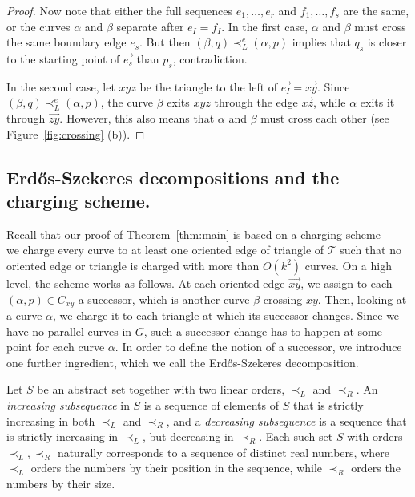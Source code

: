 \documentclass[11pt]{amsart}
\theoremstyle{definition}
\newcommand{\cT}{\mathcal{T}}
\begin{document}
\begin{proof}
\begin{minipage}[t]{0.65\textwidth}
Now note that either the full sequences $e_1, \dots, e_r$ and $f_1, \dots, f_s$ are the same, or the curves $\alpha$ and $\beta$ separate after $e_I=f_I$. 
In the first case, $\alpha$ and $\beta$ must cross the same boundary edge $e_s$. But then $(\beta, q)\prec_L^{e} (\alpha, p)$ implies that $q_s$ is closer to the starting point of $\vec{e_s}$ than $p_s$, contradiction.

In the second case, let $xyz$ be the triangle to the left of $\vec{e_I}=\vec{xy}$.
Since $(\beta, q)\prec_L^{e}(\alpha, p)$, the curve $\beta$ exits $xyz$ through the edge $\vec{xz}$, while $\alpha$ exits it through $\vec{zy}$. However, this also means that $\alpha$ and $\beta$ must cross each other (see Figure~\ref{fig:crossing} (b)).\qedhere

\end{minipage}\par
\end{proof}

\subsection{Erd\H{o}s-Szekeres decompositions and the charging scheme.}

Recall that our proof of Theorem~\ref{thm:main} is based on a charging scheme --- we charge every curve to at least one oriented edge of triangle of $\cT$ such that no oriented edge or triangle is charged with more than $O(k^2)$ curves.
On a high level, the scheme works as follows.
At each oriented edge $\vec{xy}$, we assign to each $(\alpha, p) \in C_{xy}$ a successor, which is another curve $\beta$ crossing $xy$.
Then, looking at a curve $\alpha$, we charge it to each triangle at which its successor changes.
Since we have no parallel curves in $G$, such a successor change has to happen at some point for each curve $\alpha$. In order to define the notion of a successor, we introduce one further ingredient, which we call the Erd\H{o}s-Szekeres decomposition.

Let $S$ be an abstract set together with two linear orders, $\prec_L$ and $\prec_R$. 
An \emph{increasing subsequence} in $S$ is a sequence of elements of $S$ that is strictly increasing in both $\prec_L$ and $\prec_R$, and a \emph{decreasing subsequence} is a sequence that is strictly increasing in $\prec_L$, but decreasing in $\prec_R$. 
Each such set $S$ with orders $\prec_L, \prec_R$ naturally corresponds to a sequence of distinct real numbers, where $\prec_L$ orders the numbers by their position in the sequence, while $\prec_R$ orders the numbers by their size.
\end{document}
